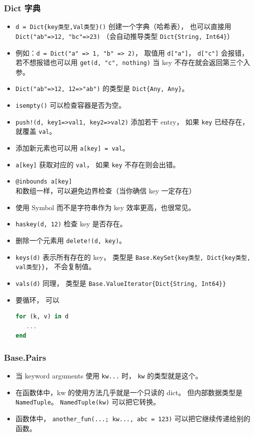 \subsubsection{Dict 字典}
\begin{itemize}
\item \verb`d = Dict{key类型,Val类型}()` 创建一个字典（哈希表）， 也可以直接用 \verb`Dict("ab"=>12, "bc"=>23)` （会自动推导类型 \verb`Dict{String, Int64}`）
\item 例如：\verb`d = Dict("a" => 1, "b" => 2)`， 取值用 \verb`d["a"]`， \verb`d["c"]` 会报错， 若不想报错也可以用 \verb`get(d, "c", nothing)` 当 key 不存在就会返回第三个入参。
\item \verb`Dict("ab"=>12, 12=>"ab")` 的类型是 \verb`Dict{Any, Any}`。
\item \verb`isempty()` 可以检查容器是否为空。
\item \verb`push!(d, key1=>val1, key2=>val2)` 添加若干 entry， 如果 \verb`key` 已经存在， 就覆盖 \verb`val`。
\item 添加新元素也可以用 \verb`a[key] = val`。
\item \verb`a[key]` 获取对应的 \verb`val`， 如果 \verb`key` 不存在则会出错。
\item \verb`@inbounds a[key]` 和数组一样，可以避免边界检查（当你确信 key 一定存在）
\item 使用 Symbol 而不是字符串作为 key 效率更高，也很常见。
\item \verb`haskey(d, 12)` 检查 key 是否存在。
\item 删除一个元素用 \verb`delete!(d, key)`。
\item \verb`keys(d)` 表示所有存在的 key， 类型是 \verb`Base.KeySet{key类型, Dict{key类型, val类型}}`， 不会复制值。
\item \verb`vals(d)` 同理， 类型是 \verb`Base.ValueIterator{Dict{String, Int64}}`
\item 要循环， 可以
\begin{lstlisting}[language=julia]
for (k, v) in d
   ...
end
\end{lstlisting}
\end{itemize}

\subsubsection{Base.Pairs}
\begin{itemize}
\item 当 keyword arguments 使用 \verb`kw...` 时， \verb`kw` 的类型就是这个。
\item 在函数体中，kw 的使用方法几乎就是一个只读的 dict。 但内部数据类型是 \verb`NamedTuple`。 \verb`NamedTuple(kw)` 可以把它转换。
\item 函数体中， \verb`another_fun(...; kw..., abc = 123)` 可以把它继续传递给别的函数。
\end{itemize}




